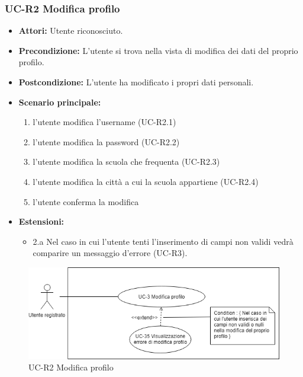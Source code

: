 \subsubsection{UC-R2 Modifica profilo}
		\begin{itemize}
			\item \textbf{Attori:} Utente riconosciuto.
			\item \textbf{Precondizione:} L'utente si trova nella vista di modifica dei dati del proprio profilo.
			\item \textbf{Postcondizione:} L'utente ha modificato i propri dati personali.
			\item \textbf{Scenario principale:}
				\begin{enumerate}
					\item l'utente modifica l'username (UC-R2.1)
					\item  l'utente modifica la password (UC-R2.2)
					\item l'utente modifica la scuola che frequenta (UC-R2.3) 
					\item l'utente modifica la città a cui la scuola appartiene (UC-R2.4)
					\item l'utente conferma la modifica
				\end{enumerate}
				\item \textbf{Estensioni:}
				\begin{itemize}
					\item 2.a Nel caso in cui l'utente tenti l'inserimento di campi non validi vedrà comparire un messaggio d'errore (UC-R3).
				\end{itemize}
		\end{itemize}
		\begin{figure}[htbp]
			\centering
			\includegraphics[scale=0.7]{images/UC-3.png}
			\caption{UC-R2 Modifica profilo}
		\end{figure}
		
